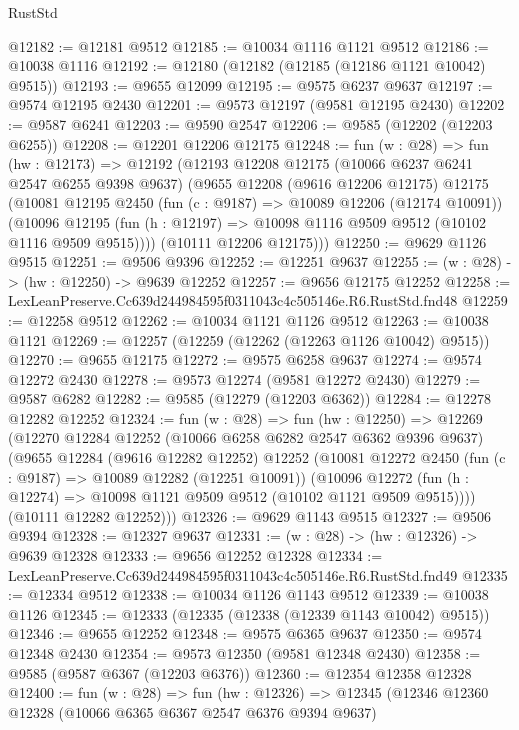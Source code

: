 \begin{lexlean}{RustStd}
\begin{coremodule}
@12182 := @12181 @9512
@12185 := @10034 @1116 @1121 @9512
@12186 := @10038 @1116
@12192 := @12180 (@12182 (@12185 (@12186 @1121 @10042) @9515))
@12193 := @9655 @12099
@12195 := @9575 @6237 @9637
@12197 := @9574 @12195 @2430
@12201 := @9573 @12197 (@9581 @12195 @2430)
@12202 := @9587 @6241
@12203 := @9590 @2547
@12206 := @9585 (@12202 (@12203 @6255))
@12208 := @12201 @12206 @12175
@12248 := fun (w : @28) =>
  fun (hw : @12173) =>
  @12192
    (@12193
      @12208
      @12175
      (@10066 @6237 @6241 @2547 @6255 @9398 @9637)
      (@9655
        @12208
        (@9616 @12206 @12175)
        @12175
        (@10081
          @12195
          @2450
          (fun (c : @9187) => @10089 @12206 (@12174 @10091))
          (@10096 @12195 (fun (h : @12197) => @10098 @1116 @9509 @9512 (@10102 @1116 @9509 @9515))))
        (@10111 @12206 @12175)))
@12250 := @9629 @1126 @9515
@12251 := @9506 @9396
@12252 := @12251 @9637
@12255 := (w : @28) -> (hw : @12250) -> @9639 @12252
@12257 := @9656 @12175 @12252
@12258 := LexLeanPreserve.Cc639d244984595f0311043c4c505146e.R6.RustStd.fnd48
@12259 := @12258 @9512
@12262 := @10034 @1121 @1126 @9512
@12263 := @10038 @1121
@12269 := @12257 (@12259 (@12262 (@12263 @1126 @10042) @9515))
@12270 := @9655 @12175
@12272 := @9575 @6258 @9637
@12274 := @9574 @12272 @2430
@12278 := @9573 @12274 (@9581 @12272 @2430)
@12279 := @9587 @6282
@12282 := @9585 (@12279 (@12203 @6362))
@12284 := @12278 @12282 @12252
@12324 := fun (w : @28) =>
  fun (hw : @12250) =>
  @12269
    (@12270
      @12284
      @12252
      (@10066 @6258 @6282 @2547 @6362 @9396 @9637)
      (@9655
        @12284
        (@9616 @12282 @12252)
        @12252
        (@10081
          @12272
          @2450
          (fun (c : @9187) => @10089 @12282 (@12251 @10091))
          (@10096 @12272 (fun (h : @12274) => @10098 @1121 @9509 @9512 (@10102 @1121 @9509 @9515))))
        (@10111 @12282 @12252)))
@12326 := @9629 @1143 @9515
@12327 := @9506 @9394
@12328 := @12327 @9637
@12331 := (w : @28) -> (hw : @12326) -> @9639 @12328
@12333 := @9656 @12252 @12328
@12334 := LexLeanPreserve.Cc639d244984595f0311043c4c505146e.R6.RustStd.fnd49
@12335 := @12334 @9512
@12338 := @10034 @1126 @1143 @9512
@12339 := @10038 @1126
@12345 := @12333 (@12335 (@12338 (@12339 @1143 @10042) @9515))
@12346 := @9655 @12252
@12348 := @9575 @6365 @9637
@12350 := @9574 @12348 @2430
@12354 := @9573 @12350 (@9581 @12348 @2430)
@12358 := @9585 (@9587 @6367 (@12203 @6376))
@12360 := @12354 @12358 @12328
@12400 := fun (w : @28) =>
  fun (hw : @12326) =>
  @12345
    (@12346
      @12360
      @12328
      (@10066 @6365 @6367 @2547 @6376 @9394 @9637)

\end{coremodule}
\end{lexlean}
